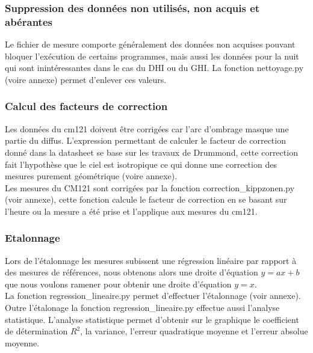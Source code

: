 \documentclass[12pt,a4paper]{article}
\begin{document}
\begin{flushleft}
\subsubsection{Suppression des données non utilisés, non acquis et abérantes}

Le fichier de mesure comporte généralement des données non acquises pouvant bloquer l'exécution de certains programmes, mais aussi les données pour la nuit qui sont inintéressantes dans le cas du DHI ou du GHI. La fonction nettoyage.py (voire annexe) permet d'enlever ces valeurs.

\subsubsection{Calcul des facteurs de correction}

Les données du cm121 doivent être corrigées car l'arc d'ombrage masque une partie du diffus. L'expression permettant de calculer le facteur de correction donné dans la datasheet se base sur les travaux de Drummond, cette correction fait l'hypothèse que le ciel est isotropique ce qui donne une correction des mesures purement géométrique (voire annexe).\\

Les mesures du CM121 sont corrigées par la fonction correction\_kippzonen.py (voir annexe), cette fonction calcule le facteur de correction en se basant sur l'heure ou la mesure a été prise et l'applique aux mesures du cm121.

\subsubsection{Etalonnage}

Lors de l'étalonnage les mesures subissent une régression linéaire par rapport à des mesures de références, nous obtenons alors une droite d'équation $y = ax + b$ que nous voulons ramener pour obtenir une droite d'équation $y = x$.\\

La fonction regression\_lineaire.py permet d'effectuer l'étalonnage (voir annexe). Outre l'étalonage la fonction regression\_lineaire.py effectue aussi l'analyse statistique. L'analyse statistique permet d'obtenir sur le graphique le coefficient de détermination $R^2$, la variance, l'erreur quadratique moyenne et  l'erreur absolue moyenne.\\


\end{flushleft}
\end{document}
